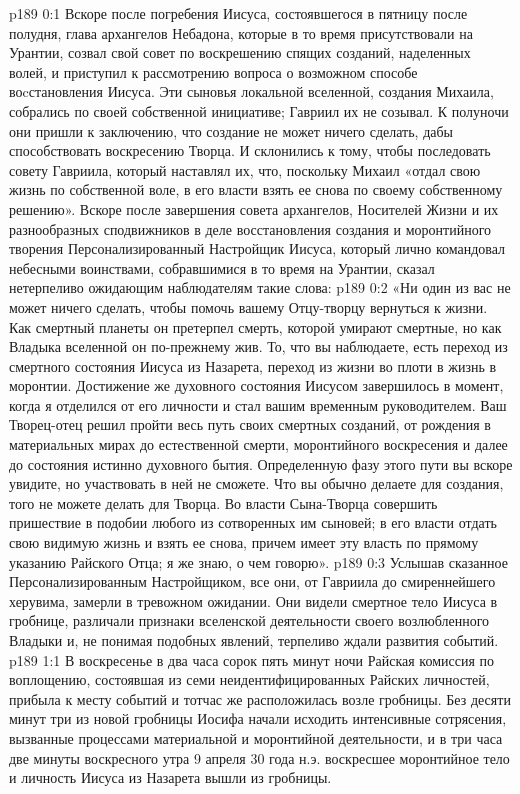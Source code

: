 \author{Комиссия срединников}
\vs p189 0:1 Вскоре после погребения Иисуса, состоявшегося в пятницу после полудня, глава архангелов Небадона, которые в то время присутствовали на Урантии, созвал свой совет по воскрешению спящих созданий, наделенных волей, и приступил к рассмотрению вопроса о возможном способе воcстановления Иисуса. Эти сыновья локальной вселенной, создания Михаила, собрались по своей собственной инициативе; Гавриил их не созывал. К полуночи они пришли к заключению, что создание не может ничего сделать, дабы способствовать воскресению Творца. И склонились к тому, чтобы последовать совету Гавриила, который наставлял их, что, поскольку Михаил «отдал свою жизнь по собственной воле, в его власти взять ее снова по своему собственному решению». Вскоре после завершения совета архангелов, Носителей Жизни и их разнообразных сподвижников в деле восстановления создания и моронтийного творения Персонализированный Настройщик Иисуса, который лично командовал небесными воинствами, собравшимися в то время на Урантии, сказал нетерпеливо ожидающим наблюдателям такие слова:
\vs p189 0:2 «Ни один из вас не может ничего сделать, чтобы помочь вашему Отцу\hyp{}творцу вернуться к жизни. Как смертный планеты он претерпел смерть, которой умирают смертные, но как Владыка вселенной он по\hyp{}прежнему жив. То, что вы наблюдаете, есть переход из смертного состояния Иисуса из Назарета, переход из жизни во плоти в жизнь в моронтии. Достижение же духовного состояния Иисусом завершилось в момент, когда я отделился от его личности и стал вашим временным руководителем. Ваш Творец\hyp{}отец решил пройти весь путь своих смертных созданий, от рождения в материальных мирах до естественной смерти, моронтийного воскресения и далее до состояния истинно духовного бытия. Определенную фазу этого пути вы вскоре увидите, но участвовать в ней не сможете. Что вы обычно делаете для создания, того не можете делать для Творца. Во власти Сына\hyp{}Творца совершить пришествие в подобии любого из сотворенных им сыновей; в его власти отдать свою видимую жизнь и взять ее снова, причем имеет эту власть по прямому указанию Райского Отца; я же знаю, о чем говорю».
\vs p189 0:3 Услышав сказанное Персонализированным Настройщиком, все они, от Гавриила до смиреннейшего херувима, замерли в тревожном ожидании. Они видели смертное тело Иисуса в гробнице, различали признаки вселенской деятельности своего возлюбленного Владыки и, не понимая подобных явлений, терпеливо ждали развития событий.
\vs p189 1:1 В воскресенье в два часа сорок пять минут ночи Райская комиссия по воплощению, состоявшая из семи неидентифицированных Райских личностей, прибыла к месту событий и тотчас же расположилась возле гробницы. Без десяти минут три из новой гробницы Иосифа начали исходить интенсивные сотрясения, вызванные процессами материальной и моронтийной деятельности, и в три часа две минуты воскресного утра 9 апреля 30 года н.э. воскресшее моронтийное тело и личность Иисуса из Назарета вышли из гробницы.
